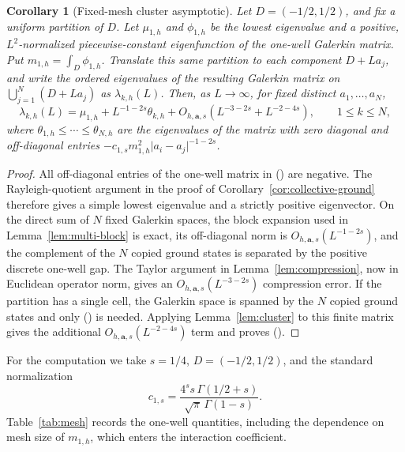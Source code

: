 \documentclass[twoside,10pt]{article}
\numberwithin{equation}{section}
\theoremstyle{slbody}
\newtheorem{corollary}[theorem]{Corollary}
\theoremstyle{definition}
\newcommand{\abs}[1]{\lvert #1\rvert}
\renewcommand{\eqref}[1]{%
  \textup{{\normalfont(\oldstylenums{\ref{#1}}}\normalfont)}}
\begin{document}
\begin{samepage}
\begin{corollary}[Fixed-mesh cluster asymptotic]
\label{cor:discrete-cluster}
Let $D=(-1/2,1/2)$, and fix a uniform partition of $D$.  Let $\mu_{1,h}$
and $\phi_{1,h}$ be the lowest eigenvalue and a positive,
$L^2$-normalized piecewise-constant eigenfunction of the one-well Galerkin
matrix.  Put $m_{1,h}=\int_D\phi_{1,h}$.  Translate this same partition to
each component $D+La_j$, and write the ordered eigenvalues of the resulting
Galerkin matrix on $\bigcup_{j=1}^N(D+La_j)$ as $\lambda_{k,h}(L)$.  Then,
as $L\to\infty$, for fixed distinct
$a_1,\dots,a_N$,
\begin{equation}\label{eq:discrete-cluster}
 \lambda_{k,h}(L)
 =\mu_{1,h}+L^{-1-2s}\theta_{k,h}
 +O_{h,\mathbf a,s}\!\left(L^{-3-2s}+L^{-2-4s}\right),
 \qquad 1\leq k\leq N,
\end{equation}
where $\theta_{1,h}\leq\cdots\leq\theta_{N,h}$ are the eigenvalues of the
matrix with zero diagonal and off-diagonal entries
$-c_{1,s}m_{1,h}^2\abs{a_i-a_j}^{-1-2s}$.
\end{corollary}
\end{samepage}

\begin{proof}
All off-diagonal entries of the one-well matrix in
\eqref{eq:cell-offdiagonal} are negative.  The Rayleigh-quotient argument in
the proof of Corollary~\ref{cor:collective-ground} therefore gives a simple
lowest eigenvalue and a strictly positive eigenvector.  On the direct sum of
$N$ fixed Galerkin spaces, the
block expansion used in Lemma~\ref{lem:multi-block} is exact, its
off-diagonal norm is $O_{h,\mathbf a,s}(L^{-1-2s})$, and the complement of
the $N$ copied ground states is separated by the positive discrete
one-well gap.  The Taylor argument in Lemma~\ref{lem:compression}, now in
Euclidean operator norm, gives an
$O_{h,\mathbf a,s}(L^{-3-2s})$ compression error.  If the partition has a
single cell, the Galerkin space is spanned by the $N$ copied ground states and
only \eqref{eq:cluster-bound} is needed.  Applying
Lemma~\ref{lem:cluster} to this finite matrix gives the additional
$O_{h,\mathbf a,s}(L^{-2-4s})$ term and proves
\eqref{eq:discrete-cluster}.
\end{proof}

For the computation we take $s=1/4$, $D=(-1/2,1/2)$, and the standard
normalization
\[
 c_{1,s}=\frac{4^s s\,\Gamma(1/2+s)}
 {\sqrt\pi\,\Gamma(1-s)}.
\]
Table~\ref{tab:mesh} records the one-well quantities, including the dependence
on mesh size of $m_{1,h}$, which enters the interaction coefficient.
\end{document}
